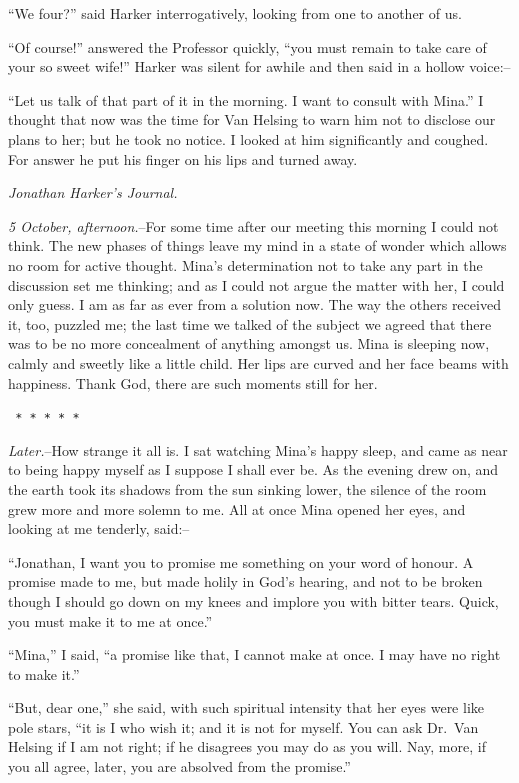 \documentclass[12pt,openright]{book}
\begin{document}
“We four?” said Harker interrogatively, looking from one to another of us.

“Of course!” answered the Professor quickly, “you must remain to take care of your so sweet wife!” Harker was silent for awhile and then said in a hollow voice:–

“Let us talk of that part of it in the morning. I want to consult with Mina.” I thought that now was the time for Van Helsing to warn him not to disclose our plans to her; but he took no notice. I looked at him significantly and coughed. For answer he put his finger on his lips and turned away.

\textit{Jonathan Harker’s Journal.}

\textit{5 October, afternoon.}–For some time after our meeting this morning I could not think. The new phases of things leave my mind in a state of wonder which allows no room for active thought. Mina’s determination not to take any part in the discussion set me thinking; and as I could not argue the matter with her, I could only guess. I am as far as ever from a solution now. The way the others received it, too, puzzled me; the last time we talked of the subject we agreed that there was to be no more concealment of anything amongst us. Mina is sleeping now, calmly and sweetly like a little child. Her lips are curved and her face beams with happiness. Thank God, there are such moments still for her.

\texttt{   *       *       *       *       *}

\textit{Later.}–How strange it all is. I sat watching Mina’s happy sleep, and came as near to being happy myself as I suppose I shall ever be. As the evening drew on, and the earth took its shadows from the sun sinking lower, the silence of the room grew more and more solemn to me. All at once Mina opened her eyes, and looking at me tenderly, said:–

“Jonathan, I want you to promise me something on your word of honour. A promise made to me, but made holily in God’s hearing, and not to be broken though I should go down on my knees and implore you with bitter tears. Quick, you must make it to me at once.”

“Mina,” I said, “a promise like that, I cannot make at once. I may have no right to make it.”

“But, dear one,” she said, with such spiritual intensity that her eyes were like pole stars, “it is I who wish it; and it is not for myself. You can ask Dr. Van Helsing if I am not right; if he disagrees you may do as you will. Nay, more, if you all agree, later, you are absolved from the promise.”
\end{document}
